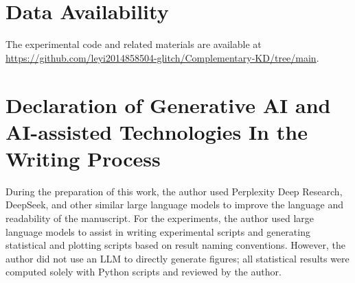 \documentclass[a4paper,fleqn]{cas-dc}
\begin{document}
\section*{Data Availability}

The experimental code and related materials are available at
\url{https://github.com/leyi2014858504-glitch/Complementary-KD/tree/main}.

\section*{Declaration of Generative AI and AI-assisted Technologies In the Writing Process}


During the preparation of this work, the author used Perplexity Deep Research, DeepSeek, and other similar large
language models to improve the language and readability of the manuscript. For the experiments, the author
used large language models to assist in writing experimental scripts and generating statistical and plotting scripts based
on result naming conventions. However, the author did not use an LLM to directly
generate figures; all statistical results were computed solely with Python scripts and reviewed by the author.

\printcredits

%





\end{document}
